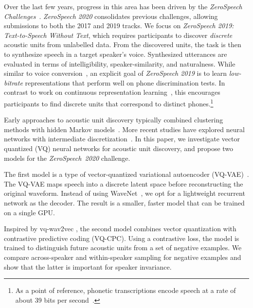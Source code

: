 \documentclass[a4paper]{article}
\begin{document}
Over the last few years, progress in this area has been driven by the \textit{ZeroSpeech Challenges}~\cite{versteegh+etal_sltu16,dunbar+etal_asru17,dunbar+etal_interspeech19}.
\textit{ZeroSpeech 2020} consolidates previous challenges, allowing submissions to both the 2017 and 2019 tracks.
We focus on \textit{ZeroSpeech 2019: Text-to-Speech Without Text}, which requires participants to discover \textit{discrete} acoustic units from unlabelled data. 
From the discovered units, the task is then to synthesize speech in a target speaker's voice.
Synthesized utterances are evaluated in terms of intelligibility, speaker-similarity, and naturalness. 
While similar to voice conversion~\cite{kain+etal_icassp98,chou+etal_interspeech18}, an explicit goal of \textit{ZeroSpeech 2019} is to learn \textit{low-bitrate} representations that perform well on phone discrimination tests.
In contrast to work on continuous representation learning~\cite{zeghidour+etal_interspeech16,heck+etal_ieice18,chung+etal_interspeech19,wang+etal_icassp20,last+etal_spl20}, this encourages participants to find discrete units that correspond to distinct phones.\footnote{As a point of reference, phonetic transcriptions encode speech at a rate of about 39 bits per second~\cite{coupe2019different}.}


Early approaches to acoustic unit discovery typically combined clustering methods with hidden Markov models~\cite{varadarajan+etal_acl08,lee+glass_acl12,siu+etal_csl14,lee+etal_tacl15,ondel+etal_pcs16}.
More recent studies have explored neural networks with intermediate discretization~\cite{badino+etal_interspeech15,eloff+etal_interspeech19,chorowski+etal_taslp19,tjandra+etal_interspeech19}.
In this paper, we investigate vector quantized (VQ) neural networks for acoustic unit discovery, and propose two models for the \textit{ZeroSpeech~2020} challenge.

The first model is a type of vector-quantized variational autoencoder (VQ-VAE)~\cite{vandenoord+etal_neurips17}. 
The VQ-VAE  maps speech into a discrete latent space before reconstructing the original waveform.
Instead of using WaveNet~\cite{vandenoord+etal_arxiv16}, we opt for a lightweight recurrent network as the decoder.
The result is a smaller, faster model that can be trained on a single GPU.




Inspired by vq-wav2vec \cite{baevski+etal_iclr20}, the second model combines vector quantization with contrastive predictive coding (VQ-CPC).
Using a contrastive loss, the model is trained to distinguish future acoustic units from a set of negative examples.
We compare across-speaker and within-speaker sampling for negative examples and show that the latter is important for speaker invariance.
\end{document}
